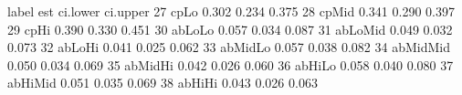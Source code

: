 \begin{Schunk}
\begin{Soutput}
      label   est ci.lower ci.upper
27     cpLo 0.302    0.234    0.375
28    cpMid 0.341    0.290    0.397
29     cpHi 0.390    0.330    0.451
30   abLoLo 0.057    0.034    0.087
31  abLoMid 0.049    0.032    0.073
32   abLoHi 0.041    0.025    0.062
33  abMidLo 0.057    0.038    0.082
34 abMidMid 0.050    0.034    0.069
35  abMidHi 0.042    0.026    0.060
36   abHiLo 0.058    0.040    0.080
37  abHiMid 0.051    0.035    0.069
38   abHiHi 0.043    0.026    0.063
\end{Soutput}
\end{Schunk}
